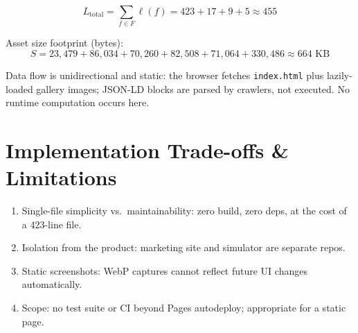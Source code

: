 \documentclass[11pt]{article}
\begin{document}
\[ L_{\text{total}} = \sum_{f \in F} \ell(f) = 423 + 17 + 9 + 5 \approx 455 \]

Asset size footprint (bytes):
\[ S = 23{,}479 + 86{,}034 + 70{,}260 + 82{,}508 + 71{,}064 + 330{,}486 \approx 664\text{ KB} \]

Data flow is unidirectional and static: the browser fetches \texttt{index.html} plus
lazily-loaded gallery images; JSON-LD blocks are parsed by crawlers, not executed. No runtime
computation occurs here.

\section{Implementation Trade-offs \& Limitations}
\begin{enumerate}
  \item Single-file simplicity vs.\ maintainability: zero build, zero deps, at the cost of a 423-line file.
  \item Isolation from the product: marketing site and simulator are separate repos.
  \item Static screenshots: WebP captures cannot reflect future UI changes automatically.
  \item Scope: no test suite or CI beyond Pages autodeploy; appropriate for a static page.
\end{enumerate}
\end{document}
